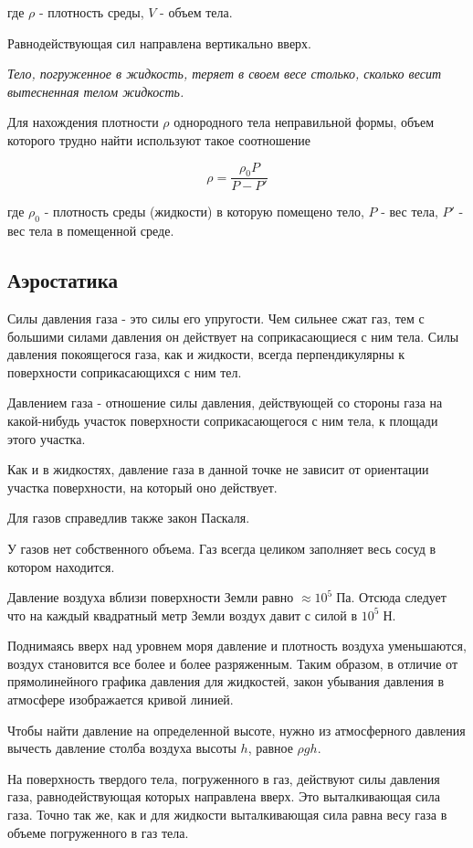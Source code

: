 \documentclass[a4paper,12pt]{article}
\begin{document}
		где $\rho$ - плотность среды, $V$ - объем тела.
		
		Равнодействующая сил направлена вертикально вверх.

		\textit{Тело, погруженное в жидкость, теряет в своем весе столько, сколько весит вытесненная
		телом жидкость.} 
		
		Для нахождения плотности $\rho$ однородного тела неправильной формы, объем которого 
		трудно найти используют такое соотношение
		
		\begin{equation}
			\rho = \frac{\rho_0 P}{P-P'}
		\end{equation}

		где $\rho_0$ - плотность среды (жидкости) в которую помещено тело, $P$ - вес тела,
		$P'$ - вес тела в помещенной среде.


		\subsection*{Аэростатика}

		Силы давления газа - это силы его упругости. Чем сильнее сжат газ, тем с большими 
		силами давления он действует на соприкасающиеся с ним тела. Силы давления покоящегося 
		газа, как и жидкости, всегда перпендикулярны к поверхности соприкасающихся с ним тел.

		Давлением газа - отношение силы давления, действующей со стороны газа на какой-нибудь
		участок поверхности соприкасающегося с ним тела, к площади этого участка. 
		
		Как и в жидкостях, давление газа в данной точке не зависит от ориентации участка 
		поверхности, на который оно действует. 
		
		Для газов справедлив также закон Паскаля.

		У газов нет собственного объема. Газ всегда целиком заполняет весь сосуд в котором
		находится. 

		Давление воздуха вблизи поверхности Земли равно $\approx 10^5 \; \text{Па}$.
		Отсюда следует что на каждый квадратный метр Земли воздух давит с силой в
		$10^5 \; \text{Н}$.

		Поднимаясь вверх над уровнем моря давление и плотность воздуха уменьшаются, 
		воздух становится все более и более разряженным.
		Таким образом, в отличие от прямолинейного графика давления для жидкостей, 
		закон убывания давления в атмосфере изображается кривой линией.

		Чтобы найти давление на определенной высоте, нужно из атмосферного давления 
		вычесть давление столба воздуха высоты $h$, равное $\rho g h$.

		На поверхность твердого тела, погруженного в газ, действуют силы давления газа,
		равнодействующая которых направлена вверх. Это выталкивающая сила газа. Точно 
		так же, как и для жидкости выталкивающая сила равна весу газа в объеме погруженного 
		в газ тела.

		
\end{document}
